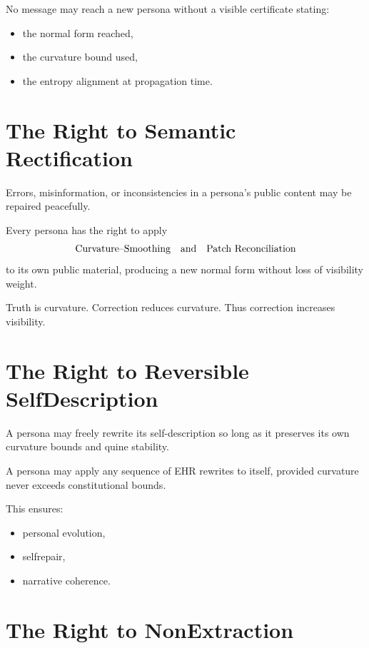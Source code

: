 No message may reach a new persona without a visible certificate
stating:
\begin{itemize}
    \item the normal form reached,
    \item the curvature bound used,
    \item the entropy alignment at propagation time.
\end{itemize}

\section{The Right to Semantic Rectification}

Errors, misinformation, or inconsistencies in a persona’s public content
may be repaired peacefully.

\begin{invariant}[Rectification]
Every persona has the right to apply  
\[
\text{Curvature\textendash Smoothing} \quad\text{and}\quad 
\text{Patch Reconciliation}
\]
to its own public material,
producing a new normal form
without loss of visibility weight.
\end{invariant}

Truth is curvature.
Correction reduces curvature.
Thus correction increases visibility.

\section{The Right to Reversible Self\textendash Description}

A persona may freely rewrite its self-description
so long as it preserves its own curvature bounds and quine stability.

\begin{invariant}
A persona may apply any sequence of EHR rewrites to itself,
provided curvature never exceeds constitutional bounds.
\end{invariant}

This ensures:
\begin{itemize}
    \item personal evolution,
    \item self\textendash repair,
    \item narrative coherence.
\end{itemize}

\section{The Right to Non\textendash Extraction}

